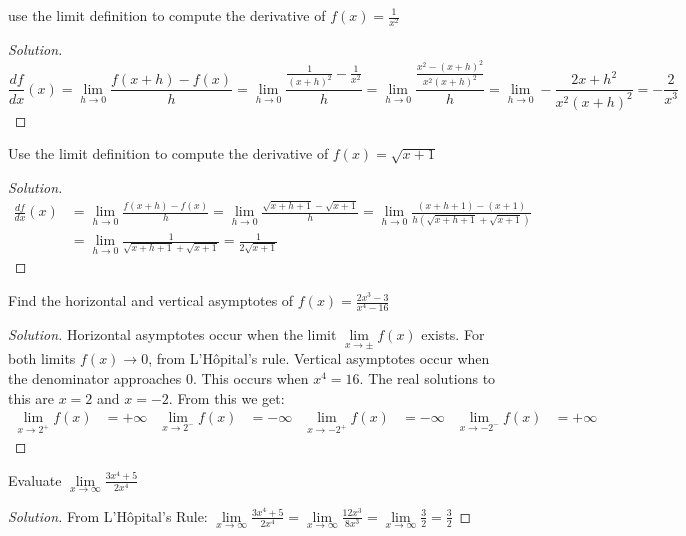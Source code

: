 \documentclass[crop=false,class=article,oneside]{standalone}
\begin{document}
            \begin{problem}
            use the limit definition to compute the derivative of $f(x)=\frac{1}{x^{2}}$
            \end{problem}
            \begin{proof}[Solution]
            \begin{equation*}
                \frac{df}{dx}(x)=\underset{h\rightarrow 0}{\lim}\frac{f(x+h)-f(x)}{h}=\underset{h\rightarrow 0}{\lim}\frac{\frac{1}{(x+h)^{2}}-\frac{1}{x^{2}}}{h}=\underset{h\rightarrow 0}{\lim}\frac{\frac{x^{2}-(x+h)^{2}}{x^{2}(x+h)^{2}}}{h}=\underset{h\rightarrow 0}{\lim}-\frac{2x+h^{2}}{x^{2}(x+h)^{2}}=-\frac{2}{x^{3}}
            \end{equation*}
            \end{proof}
            \begin{problem}
            Use the limit definition to compute the derivative of $f(x)=\sqrt{x+1}$
            \end{problem}
            \begin{proof}[Solution]
            \begin{align*}
                \frac{df}{dx}(x)&=\underset{h\rightarrow 0}{\lim}\frac{f(x+h)-f(x)}{h}=\underset{h\rightarrow 0}{\lim}\frac{\sqrt{x+h+1}-\sqrt{x+1}}{h}=\underset{h\rightarrow 0}{\lim}\frac{(x+h+1)-(x+1)}{h(\sqrt{x+h+1}+\sqrt{x+1})}\\
                &=\underset{h\rightarrow 0}{\lim}\frac{1}{\sqrt{x+h+1}+\sqrt{x+1}}=\frac{1}{2\sqrt{x+1}}
            \end{align*}
            \end{proof}
            \begin{problem}
            Find the horizontal and vertical asymptotes of $f(x)=\frac{2x^{3}-3}{x^{4}-16}$
            \end{problem}
            \begin{proof}[Solution]
            Horizontal asymptotes occur when the limit $\underset{x\rightarrow\pm}{\lim}f(x)$ exists. For both limits $f(x)\rightarrow 0$, from L'H\^{o}pital's rule. Vertical asymptotes occur when the denominator approaches 0. This occurs when $x^{4}=16$. The real solutions to this are $x=2$ and $x=-2$. From this we get:
            \begin{align*}
                \underset{x\rightarrow 2^{+}}{\lim}f(x)&=+\infty&\underset{x\rightarrow 2^{-}}{\lim}f(x)&=-\infty&\underset{x\rightarrow -2^{+}}{\lim}f(x)&=-\infty&\underset{x\rightarrow -2^{-}}{\lim}f(x)&=+\infty
            \end{align*}
            \end{proof}
            \begin{problem}
            Evaluate $\underset{x\rightarrow\infty}{\lim}\frac{3x^{4}+5}{2x^{4}}$
            \end{problem}
            \begin{proof}[Solution]
            From L'H\^{o}pital's Rule: $\underset{x\rightarrow\infty}{\lim}\frac{3x^{4}+5}{2x^{4}}=\underset{x\rightarrow\infty}{\lim}\frac{12x^{3}}{8x^{3}}=\underset{x\rightarrow \infty}{\lim}\frac{3}{2}=\frac{3}{2}$
            \end{proof}
\end{document}
